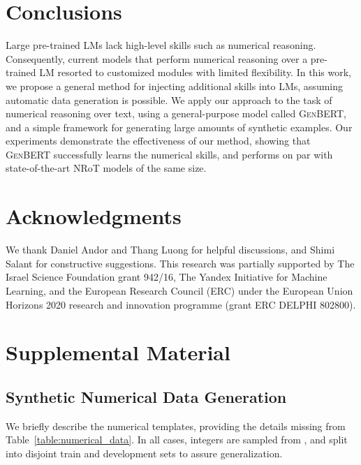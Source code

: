 \documentclass[11pt,a4paper]{article}
\newcommand\genbert{\textsc{GenBERT}}
\begin{document}
 \section{Conclusions}
Large pre-trained LMs lack high-level skills such as numerical reasoning. Consequently, current models that perform numerical reasoning over a pre-trained LM resorted to customized modules with limited flexibility.
In this work, we propose a general method for injecting additional skills into LMs, assuming automatic data generation is possible.
We apply our approach to the task of numerical reasoning over text, using a general-purpose model called \genbert{}, and a simple framework for generating large amounts of synthetic examples.
Our experiments demonstrate the effectiveness of our method, showing that \genbert{} successfully learns the numerical skills, and performs on par with state-of-the-art NRoT models of the same size.
 
\section*{Acknowledgments}
We thank Daniel Andor and Thang Luong for helpful discussions, and Shimi Salant for constructive suggestions.
This research was partially supported by
The Israel Science Foundation grant 942/16, 
The Yandex Initiative for Machine Learning, and the European Research Council (ERC) under the European Union Horizons 2020 research and innovation programme (grant ERC DELPHI 802800).





\clearpage

\appendix

\section{Supplemental Material}
\label{sec:supplemental}








\subsection{Synthetic Numerical Data Generation}
\label{section:numerical_data_details}

We briefly describe the numerical templates, providing the details missing from Table~\ref{table:numerical_data}. In all cases, integers are sampled from , and split into disjoint train and development sets to assure generalization.
\end{document}
